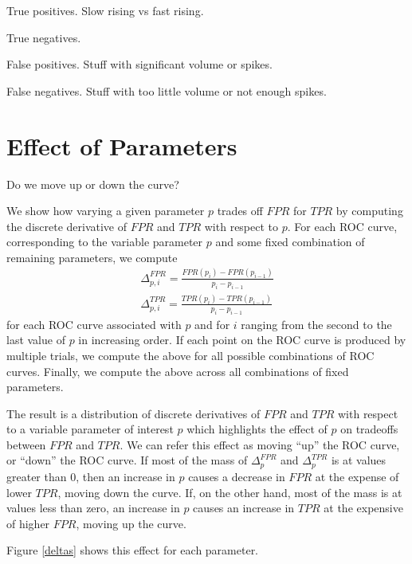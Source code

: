 True positives. Slow rising vs fast rising.

True negatives.

False positives. Stuff with significant volume or spikes.

False negatives. Stuff with too little volume or not enough spikes.

\section{Effect of Parameters}

Do we move up or down the curve?

We show how varying a given parameter $p$ trades off $FPR$ for $TPR$ by
computing the discrete derivative of $FPR$ and $TPR$ with respect to $p$. For
each ROC curve, corresponding to the variable parameter $p$ and some fixed
combination of remaining parameters, we compute
\begin{gather}
\Delta_{p,i}^{FPR} = \frac{FPR(p_{i}) - FPR(p_{i-1})}{p_i - p_{i-1}}\\
\Delta_{p,i}^{TPR} = \frac{TPR(p_{i}) - TPR(p_{i-1})}{p_i - p_{i-1}}
\end{gather}
for each ROC curve associated with $p$ and for $i$ ranging from the second to the last value
of $p$ in increasing order. If each point on the ROC curve is produced by
multiple trials, we compute the above for all possible combinations of ROC
curves. Finally, we compute the above across all combinations of fixed
parameters.

The result is a distribution of discrete derivatives of $FPR$ and $TPR$ with
respect to a variable parameter of interest $p$ which highlights the effect of
$p$ on tradeoffs between $FPR$ and $TPR$. We can refer this effect as moving
``up'' the ROC curve, or ``down'' the ROC curve. If most of the mass of
$\Delta_{p}^{FPR}$ and $\Delta_{p}^{TPR}$ is at values greater than 0, then an
increase in $p$ causes a decrease in $FPR$ at the expense of lower $TPR$, moving
down the curve. If, on the other hand, most of the mass is at values less than
zero, an increase in $p$ causes an increase in $TPR$ at the expensive of higher
$FPR$, moving up the curve.

Figure \ref{deltas} shows this effect for each parameter.

